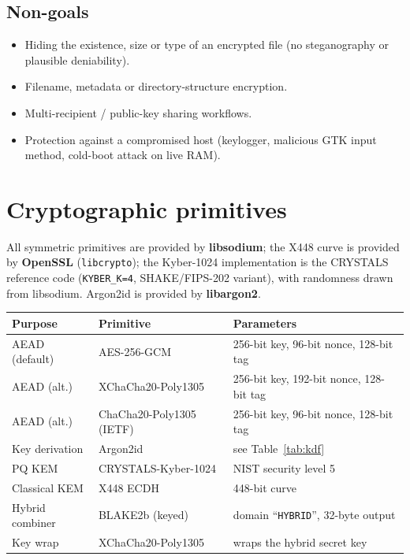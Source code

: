 \documentclass[11pt,a4paper]{article}
\newcommand{\code}[1]{\texttt{#1}}
\begin{document}
\subsection{Non-goals}
\begin{itemize}[leftmargin=1.4em]
  \item Hiding the existence, size or type of an encrypted file
        (no steganography or plausible deniability).
  \item Filename, metadata or directory-structure encryption.
  \item Multi-recipient / public-key sharing workflows.
  \item Protection against a compromised host (keylogger, malicious GTK
        input method, cold-boot attack on live RAM).
\end{itemize}

\section{Cryptographic primitives}

All symmetric primitives are provided by \textbf{libsodium}; the X448 curve is
provided by \textbf{OpenSSL} (\code{libcrypto}); the Kyber-1024 implementation
is the CRYSTALS reference code (\code{KYBER\_K=4}, SHAKE/FIPS-202 variant),
with randomness drawn from libsodium. Argon2id is provided by
\textbf{libargon2}.

\begin{center}
\begin{tabular}{@{}lll@{}}
\toprule
\textbf{Purpose} & \textbf{Primitive} & \textbf{Parameters}\\
\midrule
AEAD (default)      & AES-256-GCM              & 256-bit key, 96-bit nonce, 128-bit tag\\
AEAD (alt.)         & XChaCha20-Poly1305       & 256-bit key, 192-bit nonce, 128-bit tag\\
AEAD (alt.)         & ChaCha20-Poly1305 (IETF) & 256-bit key, 96-bit nonce, 128-bit tag\\
Key derivation      & Argon2id                 & see Table~\ref{tab:kdf}\\
PQ KEM              & CRYSTALS-Kyber-1024      & NIST security level 5\\
Classical KEM       & X448 ECDH                & 448-bit curve\\
Hybrid combiner     & BLAKE2b (keyed)          & domain ``\code{HYBRID}'', 32-byte output\\
Key wrap            & XChaCha20-Poly1305       & wraps the hybrid secret key\\
\bottomrule
\end{tabular}
\end{center}
\end{document}
